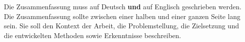 

Die Zusammenfassung muss auf Deutsch \textbf{und} auf Englisch geschrieben
werden. Die Zusammenfassung sollte zwischen einer halben und einer
ganzen Seite lang sein. Sie soll den Kontext der Arbeit, die
Problemstellung, die Zielsetzung und die entwickelten Methoden sowie
Erkenntnisse beschreiben.